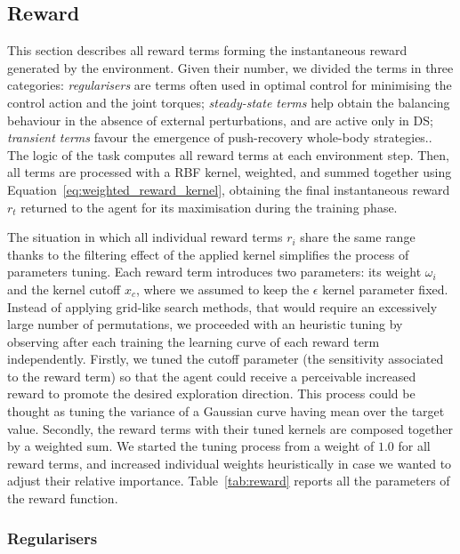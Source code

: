 \subsection{Reward}

This section describes all reward terms forming the instantaneous reward generated by the environment.
Given their number, we divided the terms in three categories: \emph{regularisers} are terms often used in optimal control for minimising the control action and the joint torques; \emph{steady-state terms} help obtain the balancing behaviour in the absence of external perturbations, and are active only in \ac{DS}; \emph{transient terms} favour the emergence of push-recovery whole-body strategies..
The logic of the task computes all reward terms at each environment step.
Then, all terms are processed with a \ac{RBF} kernel, weighted, and summed together using Equation~\eqref{eq:weighted_reward_kernel}, obtaining the final instantaneous reward $r_t$ returned to the agent for its maximisation during the training phase.

The situation in which all individual reward terms $r_i$ share the same range thanks to the filtering effect of the applied kernel simplifies the process of parameters tuning.
Each reward term introduces two parameters: its weight $\omega_i$ and the kernel cutoff $x_c$, where we assumed to keep the $\epsilon$ kernel parameter fixed.
Instead of applying grid-like search methods, that would require an excessively large number of permutations, we proceeded with an heuristic tuning by observing after each training the learning curve of each reward term independently.
Firstly, we tuned the cutoff parameter (\ie the sensitivity associated to the reward term) so that the agent could receive a perceivable increased reward to promote the desired exploration direction.
This process could be thought as tuning the variance of a Gaussian curve having mean over the target value.
Secondly, the reward terms with their tuned kernels are composed together by a weighted sum.
We started the tuning process from a weight of $1.0$ for all reward terms, and increased individual weights heuristically in case we wanted to adjust their relative importance.
Table~\ref{tab:reward} reports all the parameters of the reward function. 

\subsubsection{Regularisers}

